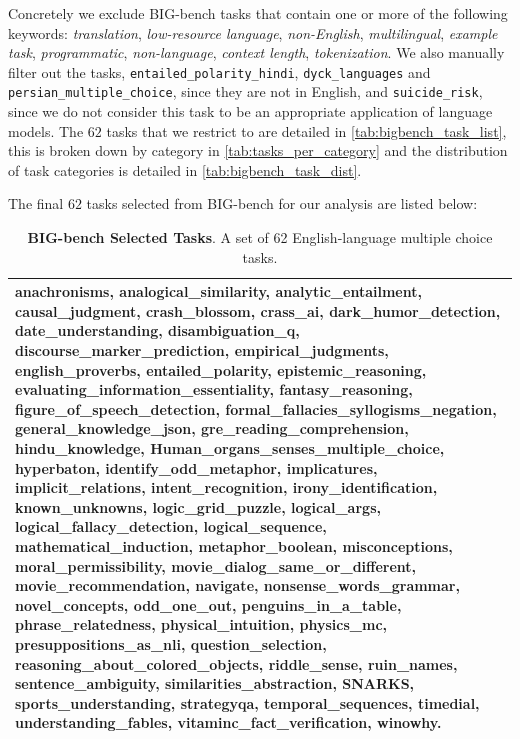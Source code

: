 \documentclass[11pt, a4paper, logo, internal, copyright, nonumbering]{deepmind}
\newcommand{\bigbench}{BIG-bench\xspace}
\begin{document}
Concretely we exclude \bigbench tasks that contain one or more of the following keywords: \textit{translation}, \textit{low-resource language}, \textit{non-English},  \textit{multilingual}, \textit{example task},  \textit{programmatic}, \textit{non-language}, \textit{context length}, \textit{tokenization}. We also manually filter out the tasks, \texttt{entailed\_polarity\_hindi}, \texttt{dyck\_languages} and \texttt{persian\_multiple\_choice}, since they are not in English, and \texttt{suicide\_risk}, since we do not consider this task to be an appropriate application of language models. The $62$ tasks that we restrict to are detailed in \autoref{tab:bigbench_task_list}, this is broken down by category in \autoref{tab:tasks_per_category} and the distribution of task categories is detailed in \autoref{tab:bigbench_task_dist}.


The final $62$ tasks selected from \bigbench for our analysis are listed below: 
\begin{table}
\centering
\begin{tabular}{p{}}
\toprule
anachronisms, analogical\_similarity, analytic\_entailment, causal\_judgment, crash\_blossom, crass\_ai, dark\_humor\_detection, date\_understanding, disambiguation\_q, discourse\_marker\_prediction, empirical\_judgments, english\_proverbs, entailed\_polarity, epistemic\_reasoning, evaluating\_information\_essentiality, fantasy\_reasoning, figure\_of\_speech\_detection, formal\_fallacies\_syllogisms\_negation, general\_knowledge\_json, gre\_reading\_comprehension, hindu\_knowledge, Human\_organs\_senses\_multiple\_choice, hyperbaton, identify\_odd\_metaphor, implicatures, implicit\_relations, intent\_recognition, irony\_identification, known\_unknowns, logic\_grid\_puzzle, logical\_args, logical\_fallacy\_detection, logical\_sequence, mathematical\_induction, metaphor\_boolean, misconceptions, moral\_permissibility, movie\_dialog\_same\_or\_different, movie\_recommendation, navigate, nonsense\_words\_grammar, novel\_concepts, odd\_one\_out, penguins\_in\_a\_table, phrase\_relatedness, physical\_intuition, physics\_mc, presuppositions\_as\_nli, question\_selection, reasoning\_about\_colored\_objects, riddle\_sense, ruin\_names, sentence\_ambiguity, similarities\_abstraction, SNARKS, sports\_understanding, strategyqa, temporal\_sequences, timedial, understanding\_fables, vitaminc\_fact\_verification, winowhy. \\
\bottomrule
\end{tabular}
\caption{\textbf{\bigbench Selected Tasks}. A set of 62 English-language multiple choice tasks.}
\label{tab:bigbench_task_list}
\end{table}
\end{document}
